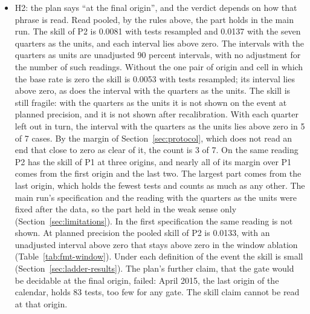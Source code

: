 \begin{itemize}
\item H2: the plan says ``at the final origin'', and the verdict depends on how that phrase is read. Read pooled, by the rules above, the part holds in the main run. The skill of P2 is 0.0081 with tests resampled and 0.0137 with the seven quarters as the units, and each interval lies above zero. The intervals with the quarters as units are unadjusted 90 percent intervals, with no adjustment for the number of such readings. Without the one pair of origin and cell in which the base rate is zero the skill is 0.0053 with tests resampled; its interval lies above zero, as does the interval with the quarters as the units. The skill is still fragile: with the quarters as the units it is not shown on the event at planned precision, and it is not shown after recalibration. With each quarter left out in turn, the interval with the quarters as the units lies above zero in 5 of 7 cases. By the margin of Section~\ref{sec:protocol}, which does not read an end that close to zero as clear of it, the count is 3 of 7. On the same reading P2 has the skill of P1 at three origins, and nearly all of its margin over P1 comes from the first origin and the last two. The largest part comes from the last origin, which holds the fewest tests and counts as much as any other. The main run's specification and the reading with the quarters as the units were fixed after the data, so the part held in the weak sense only (Section~\ref{sec:limitations}). In the first specification the same reading is not shown.
At planned precision the pooled skill of P2 is 0.0133, with an unadjusted interval above zero that stays above zero in the window ablation (Table~\ref{tab:fmt-window}). Under each definition of the event the skill is small (Section~\ref{sec:ladder-results}).
The plan's further claim, that the gate would be decidable at the final origin, failed: April 2015, the last origin of the calendar, holds 83 tests, too few for any gate. The skill claim cannot be read at that origin.

\end{itemize}
